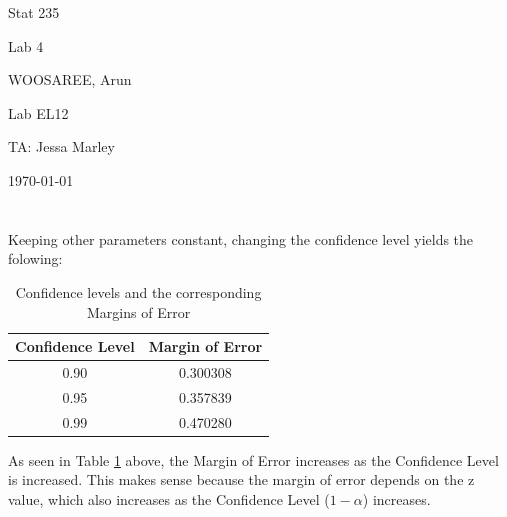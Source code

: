 \documentclass[letterpaper]{article}
\begin{document}
\begin{titlepage}
 \begin{center}
  \vspace*{1cm}
  \Huge
  Stat 235
  \vspace{1cm}
  
  Lab 4
  \vspace{1cm}
  
  WOOSAREE, Arun
  \vspace{1cm}
  
  \Huge
  Lab EL12
  \vspace{1cm}
  
  TA: Jessa Marley
  \vspace{1cm}
  
  \today
  \vfill
 \end{center}
\end{titlepage}

\section{}%

\subsection{}%
Keeping other parameters constant, changing the confidence level yields the folowing:
\begin{table}[H]
 \centering
 \begin{tabular}{|c|c|}
  \hline
  Confidence Level & Margin of Error \\ \hline
  0.90             & 0.300308        \\ \hline
  0.95             & 0.357839        \\ \hline
  0.99             & 0.470280        \\ \hline
 \end{tabular}
 \caption{Confidence levels and the corresponding Margins of Error}
 \label{1a}
\end{table}
As seen in Table \ref{1a} above, the Margin of Error increases as the
Confidence Level is increased. This makes sense because the margin of error depends on the z value, which also increases as the Confidence Level ($1-\alpha$) increases.
\end{document}
